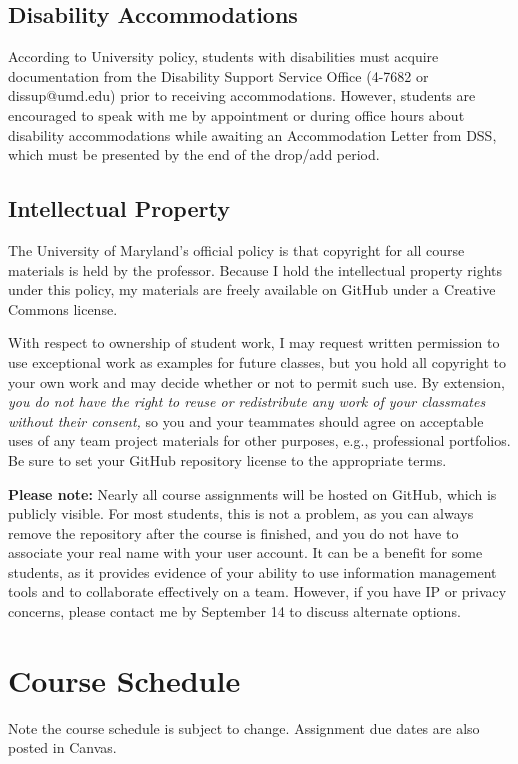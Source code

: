\documentclass[11pt]{article}
\begin{document}
\subsection{Disability Accommodations}
According to University policy, students with disabilities must acquire documentation from the Disability Support Service Office (4-7682 or dissup@umd.edu) prior to receiving accommodations.
However, students are encouraged to speak with me by appointment or during office hours about disability accommodations while awaiting an Accommodation Letter from DSS, which must be presented by the end of the drop/add period.

\subsection{Intellectual Property}
The University of Maryland's official policy is that copyright for all course materials is held by the professor. 
Because I hold the intellectual property rights under this policy, my materials are freely available on GitHub under a Creative Commons license.

With respect to ownership of student work, I may request written permission to use exceptional work as examples for future classes, but you hold all copyright to your own work and may decide whether or not to permit such use.
By extension, \textit{you do not have the right to reuse or redistribute any work of your classmates without their consent,} so you and your teammates should agree on acceptable uses of any team project materials for other purposes, e.g., professional portfolios.
Be sure to set your GitHub repository license to the appropriate terms.

\textbf{Please note:} Nearly all course assignments will be hosted on GitHub, which is publicly visible.
For most students, this is not a problem, as you can always remove the repository after the course is finished, and you do not have to associate your real name with your user account.
It can be a benefit for some students, as it provides evidence of your ability to use information management tools and to collaborate effectively on a team.
However, if you have IP or privacy concerns, please contact me by September 14 to discuss alternate options.

\clearpage
\section{Course Schedule}
Note the course schedule is subject to change.
Assignment due dates are also posted in Canvas. 
\end{document}
